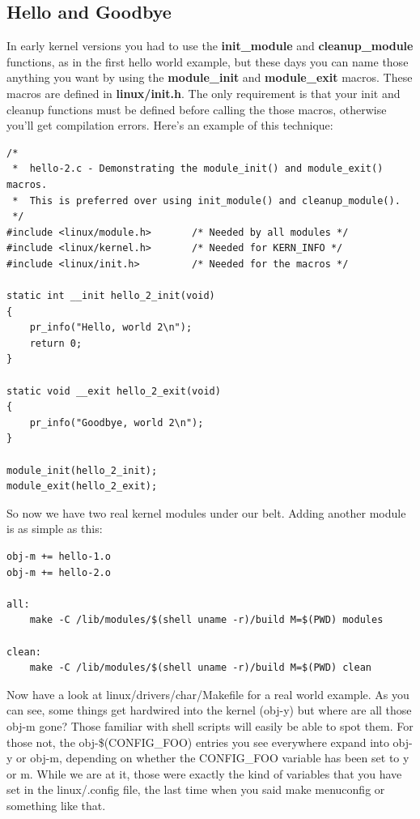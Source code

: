 \documentclass[11pt]{article}
\begin{document}
\subsection*{Hello and Goodbye}
\label{sec:org530a207}
In early kernel versions you had to use the \textbf{init\_module} and \textbf{cleanup\_module} functions, as in the first hello world example, but these days you can name those anything you want by using the \textbf{module\_init} and \textbf{module\_exit} macros. These macros are defined in \textbf{linux/init.h}. The only requirement is that your init and cleanup functions must be defined before calling the those macros, otherwise you'll get compilation errors. Here's an example of this technique:

\begin{verbatim}
/*
 *  hello-2.c - Demonstrating the module_init() and module_exit() macros.
 *  This is preferred over using init_module() and cleanup_module().
 */
#include <linux/module.h>       /* Needed by all modules */
#include <linux/kernel.h>       /* Needed for KERN_INFO */
#include <linux/init.h>         /* Needed for the macros */

static int __init hello_2_init(void)
{
    pr_info("Hello, world 2\n");
    return 0;
}

static void __exit hello_2_exit(void)
{
    pr_info("Goodbye, world 2\n");
}

module_init(hello_2_init);
module_exit(hello_2_exit);
\end{verbatim}

So now we have two real kernel modules under our belt. Adding another module is as simple as this:

\begin{verbatim}
obj-m += hello-1.o
obj-m += hello-2.o

all:
    make -C /lib/modules/$(shell uname -r)/build M=$(PWD) modules

clean:
    make -C /lib/modules/$(shell uname -r)/build M=$(PWD) clean
\end{verbatim}

Now have a look at linux/drivers/char/Makefile for a real world example. As you can see, some things get hardwired into the kernel (obj-y) but where are all those obj-m gone? Those familiar with shell scripts will easily be able to spot them. For those not, the obj-\$(CONFIG\_FOO) entries you see everywhere expand into obj-y or obj-m, depending on whether the CONFIG\_FOO variable has been set to y or m. While we are at it, those were exactly the kind of variables that you have set in the linux/.config file, the last time when you said make menuconfig or something like that.
\end{document}
